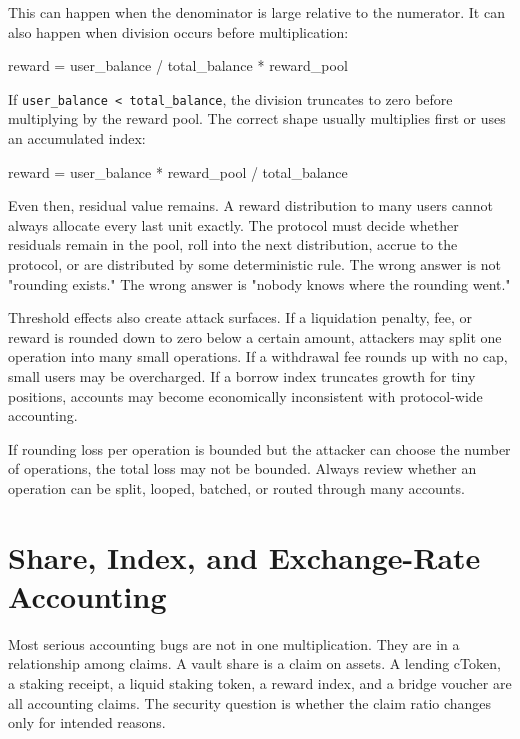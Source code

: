This can happen when the denominator is large relative to the numerator. It can also happen when division occurs before multiplication:

\begin{codeblock}
reward = user_balance / total_balance * reward_pool
\end{codeblock}

If \texttt{user\_balance < total\_balance}, the division truncates to zero before multiplying by the reward pool. The correct shape usually multiplies first or uses an accumulated index:

\begin{codeblock}
reward = user_balance * reward_pool / total_balance
\end{codeblock}

Even then, residual value remains. A reward distribution to many users cannot always allocate every last unit exactly. The protocol must decide whether residuals remain in the pool, roll into the next distribution, accrue to the protocol, or are distributed by some deterministic rule. The wrong answer is not "rounding exists." The wrong answer is "nobody knows where the rounding went."

Threshold effects also create attack surfaces. If a liquidation penalty, fee, or reward is rounded down to zero below a certain amount, attackers may split one operation into many small operations. If a withdrawal fee rounds up with no cap, small users may be overcharged. If a borrow index truncates growth for tiny positions, accounts may become economically inconsistent with protocol-wide accounting.

\begin{failuremodebox}
If rounding loss per operation is bounded but the attacker can choose the number of operations, the total loss may not be bounded. Always review whether an operation can be split, looped, batched, or routed through many accounts.
\end{failuremodebox}

\section{Share, Index, and Exchange-Rate Accounting}

Most serious accounting bugs are not in one multiplication. They are in a relationship among claims. A vault share is a claim on assets. A lending cToken, a staking receipt, a liquid staking token, a reward index, and a bridge voucher are all accounting claims. The security question is whether the claim ratio changes only for intended reasons.

